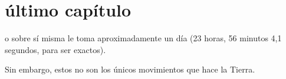 \chapter{último capítulo}

o sobre sí misma le toma aproximadamente un día (23 horas, 56 minutos 4,1 segundos, para ser exactos).

Sin embargo, estos no son los únicos movimientos que hace la Tierra.
